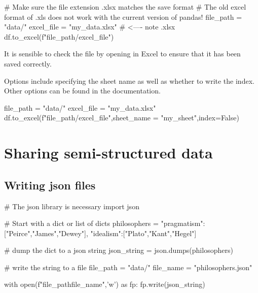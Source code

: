\begin{pycode}
    # Make sure the file extension .xlsx matches the save format
    # The old excel format of .xls does not work with the current version of pandas!
    file_path = "data/"
    excel_file = "my_data.xlsx" # <---- note .xlsx
    df.to_excel(f"{file_path}/{excel_file}")
\end{pycode}

It is sensible to check the file by opening in Excel to ensure that it has been saved correctly.

Options include specifying the sheet name as well as whether to write the index. Other options can be found in the documentation.

\begin{pycode}
    file_path = "data/"
    excel_file = "my_data.xlsx"
    df.to_excel(f"{file_path}/{excel_file}",sheet_name = "my_sheet",index=False)
\end{pycode}

\section{Sharing semi-structured data}

\subsection{Writing json files}

\begin{pycode}
    # The json library is necessary
    import json

    # Start with a dict or list of dicts
    philosophers = {
        "pragmatism":["Peirce","James","Dewey"],
        "idealism":["Plato","Kant","Hegel"]
    }

    # dump the dict to a json string
    json_string = json.dumps(philosophers)

    # write the string to a file
    file_path = "data/"
    file_name = "philosophers.json"

    with open(f"{file_path}{file_name}",'w') as fp:
        fp.write(json_string)

\end{pycode}